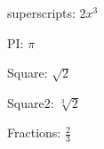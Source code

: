 \documentclass[12pt]{article}
\begin{document}

superscripts: $2x^3$

PI: $\pi$

Square: $\sqrt{2}$

Square2: $\sqrt[3]{2}$

Fractions: $\frac{2}{3}$

\end{document}
